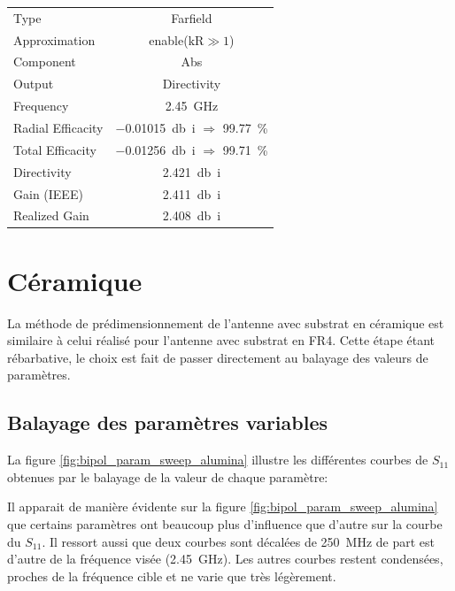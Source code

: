 \documentclass[Deriaz_Traiber_Labo02]{subfiles}
\begin{document}
\begin{table}[H]
\centering
\begin{tabular}{l c}\hline
Type					& Farfield\\
Approximation		& enable($\text{kR}\gg1$)\\
Component			& Abs\\
Output				& Directivity\\
Frequency			& \SI{2.45}{\giga\hertz}\\
Radial Efficacity	& \SI{-0.01015}{\decibel i} $\Rightarrow$ \SI{99.77}{\percent}\\
Total Efficacity		& \SI{-0.01256}{\decibel i} $\Rightarrow$ \SI{99.71}{\percent}\\
Directivity			& \SI{2.421}{\decibel i}\\
Gain	 (IEEE)			& \SI{2.411}{\decibel i}\\
Realized Gain		& \SI{2.408}{\decibel i}\\\hline
\end{tabular}
\end{table}



\pagebreak

\section{Céramique}

La méthode de prédimensionnement de l'antenne avec substrat en céramique est similaire à celui réalisé pour l'antenne avec substrat en FR4. Cette étape étant rébarbative, le choix est fait de passer directement au balayage des valeurs de paramètres.

\subsection{Balayage des paramètres variables}


La figure \ref{fig:bipol_param_sweep_alumina} illustre les différentes courbes de $S_{11}$ obtenues par le balayage de la valeur de chaque paramètre:


Il apparait de manière évidente sur la figure \ref{fig:bipol_param_sweep_alumina} que certains paramètres ont beaucoup plus d'influence que d'autre sur la courbe du $S_{11}$. Il ressort aussi que deux courbes sont décalées de \SI{250}{\mega\hertz} de part est d'autre de la fréquence visée (\SI{2.45}{\giga\hertz}). Les autres courbes restent condensées, proches de la fréquence cible et ne varie que très légèrement.\\
\end{document}
